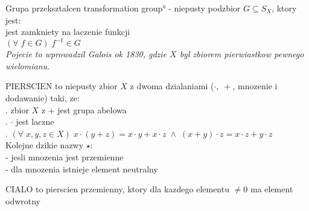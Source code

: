 \begin{multicols}{2}
    {\color{def}Grupa przeksztalcen} \ang{transformation group} - niepusty podzbior $G\subseteq S_X$, ktory jest:\\
        \point jest zamkniety na laczenie funkcji\\
        \point $(\forall\;f\in G)\;f^{-1}\in G$\\
    \emph{Pojecie to wprowadzil Galois ok 1830, gdzie $X$ byl zbiorem pierwiastkow pewnego wielomianu.}
    \bigskip

    {\color{def}PIERSCIEN} to niepusty zbior $X$ z dwoma dzialaniami ($\cdot,\;+$, mnozenie i dodawanie) taki, ze:\smallskip\\
    . zbior $X$ z $+$ jest grupa abelowa\smallskip\\
    . $\cdot$ jest laczne\smallskip\\
    . $(\forall\;x,y,z\in X)\;x\cdot(y+z)=x\cdot y+x\cdot z\;\land\;(x+y)\cdot z=x\cdot z+y\cdot z$\smallskip\\
    Kolejne dzikie nazwy $\star$:\smallskip\\
     - jesli mnozenia jest przemienne\smallskip\\
     - dla mnozenia istnieje element neutralny\medskip

    {\color{def}CIALO} to pierscien przemienny, ktory dla kazdego elementu $\neq 0$ ma element odwrotny

\end{multicols}\bigskip

\bigskip

